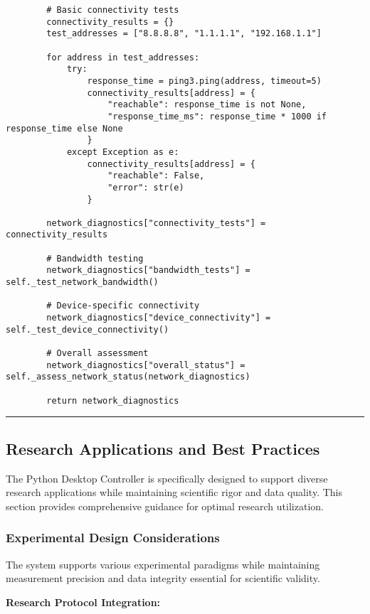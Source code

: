 \documentclass[11pt,a4paper]{article}
\begin{document}
\begin{verbatim}
        # Basic connectivity tests
        connectivity_results = {}
        test_addresses = ["8.8.8.8", "1.1.1.1", "192.168.1.1"]

        for address in test_addresses:
            try:
                response_time = ping3.ping(address, timeout=5)
                connectivity_results[address] = {
                    "reachable": response_time is not None,
                    "response_time_ms": response_time * 1000 if response_time else None
                }
            except Exception as e:
                connectivity_results[address] = {
                    "reachable": False,
                    "error": str(e)
                }

        network_diagnostics["connectivity_tests"] = connectivity_results

        # Bandwidth testing
        network_diagnostics["bandwidth_tests"] = self._test_network_bandwidth()

        # Device-specific connectivity
        network_diagnostics["device_connectivity"] = self._test_device_connectivity()

        # Overall assessment
        network_diagnostics["overall_status"] = self._assess_network_status(network_diagnostics)

        return network_diagnostics
\end{verbatim}

\hrule

\subsection{Research Applications and Best Practices}

The Python Desktop Controller is specifically designed to support diverse research applications while maintaining
scientific rigor and data quality. This section provides comprehensive guidance for optimal research utilization.

\subsubsection{Experimental Design Considerations}

The system supports various experimental paradigms while maintaining measurement precision and data integrity essential
for scientific validity.

\textbf{Research Protocol Integration:}
\end{document}
